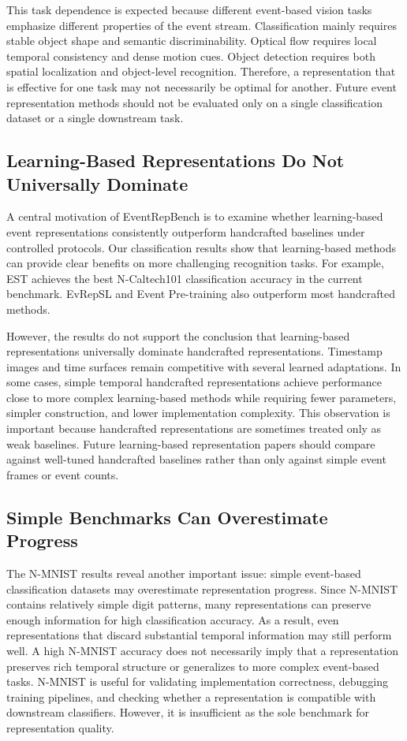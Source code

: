 \documentclass[letterpaper]{article}
\begin{document}
This task dependence is expected because different event-based vision tasks emphasize different properties of the event stream. Classification mainly requires stable object shape and semantic discriminability. Optical flow requires local temporal consistency and dense motion cues. Object detection requires both spatial localization and object-level recognition. Therefore, a representation that is effective for one task may not necessarily be optimal for another. Future event representation methods should not be evaluated only on a single classification dataset or a single downstream task.

\subsection{Learning-Based Representations Do Not Universally Dominate}
A central motivation of EventRepBench is to examine whether learning-based event representations consistently outperform handcrafted baselines under controlled protocols. Our classification results show that learning-based methods can provide clear benefits on more challenging recognition tasks. For example, EST achieves the best N-Caltech101 classification accuracy in the current benchmark. EvRepSL and Event Pre-training also outperform most handcrafted methods.

However, the results do not support the conclusion that learning-based representations universally dominate handcrafted representations. Timestamp images and time surfaces remain competitive with several learned adaptations. In some cases, simple temporal handcrafted representations achieve performance close to more complex learning-based methods while requiring fewer parameters, simpler construction, and lower implementation complexity. This observation is important because handcrafted representations are sometimes treated only as weak baselines. Future learning-based representation papers should compare against well-tuned handcrafted baselines rather than only against simple event frames or event counts.

\subsection{Simple Benchmarks Can Overestimate Progress}
The N-MNIST results reveal another important issue: simple event-based classification datasets may overestimate representation progress. Since N-MNIST contains relatively simple digit patterns, many representations can preserve enough information for high classification accuracy. As a result, even representations that discard substantial temporal information may still perform well. A high N-MNIST accuracy does not necessarily imply that a representation preserves rich temporal structure or generalizes to more complex event-based tasks. N-MNIST is useful for validating implementation correctness, debugging training pipelines, and checking whether a representation is compatible with downstream classifiers. However, it is insufficient as the sole benchmark for representation quality.
\end{document}
